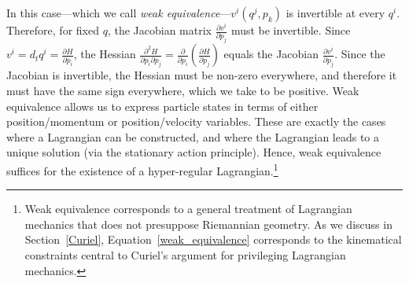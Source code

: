 \documentclass[letterpaper]{article}
\begin{document}
In this case---which we call \textit{weak equivalence}---$v^i(q^j, p_k)$ is invertible at every $q^i$. Therefore, for fixed $q$, the Jacobian matrix  $\frac{\partial v^i}{\partial p_j}$ must be invertible. Since $v^i = d_t q^i = \frac{\partial H}{\partial p_i}$, the Hessian $\frac{\partial^2 H}{\partial p_i \partial p_j} = \frac{\partial}{\partial p_i} (\frac{\partial H}{\partial p_j})$ equals the Jacobian $\frac{\partial v^i}{\partial p_j}$. Since the Jacobian is invertible, the Hessian must be non-zero everywhere, and therefore it must have the same sign everywhere, which we take to be positive. Weak equivalence allows us to express particle states in terms of either position/momentum or position/velocity variables. These are exactly the cases where a Lagrangian can be constructed, and where the Lagrangian leads to a unique solution (via the stationary action principle). Hence, weak equivalence suffices for the existence of a hyper-regular Lagrangian.\footnote{Weak equivalence corresponds to a general treatment of Lagrangian mechanics that does not presuppose Riemannian geometry. As we discuss in Section~\ref{Curiel}, Equation~\ref{weak_equivalence} corresponds to the kinematical constraints central to Curiel's \parencites*[]{Curiel} argument for privileging Lagrangian mechanics.}
\end{document}
